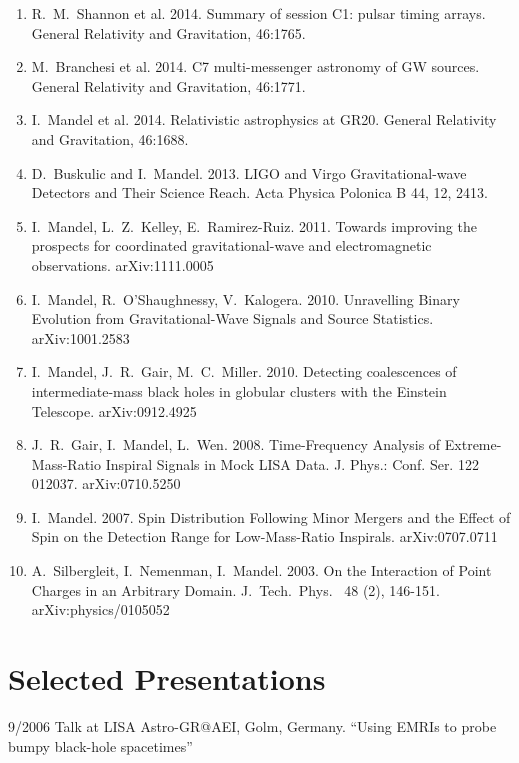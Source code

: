 \documentclass[margin,line]{res}
\begin{document}
\begin{resume}
\begin{enumerate}
\item R.~M.~Shannon et al. 2014. Summary of session C1: pulsar timing arrays. General Relativity and Gravitation, 46:1765.

\item M.~Branchesi et al. 2014.  C7 multi-messenger astronomy of GW sources.
General Relativity and Gravitation, 46:1771.

\item I.~Mandel et al.  2014.  Relativistic astrophysics at GR20.  General Relativity and Gravitation, 46:1688.

\item D.~Buskulic and I.~Mandel.  2013.  LIGO and Virgo Gravitational-wave Detectors and Their Science Reach.  Acta Physica Polonica B 44, 12, 2413.

\item I.~Mandel, L.~Z.~Kelley, E.~Ramirez-Ruiz. 2011. Towards improving the prospects for coordinated gravitational-wave and electromagnetic observations. arXiv:1111.0005
 
\item I.~Mandel, R.~O'Shaughnessy, V.~Kalogera.  2010.  Unravelling Binary Evolution from Gravitational-Wave Signals and Source Statistics. arXiv:1001.2583 

\item I.~Mandel, J.~R.~Gair, M.~C.~Miller.  2010.  Detecting coalescences of intermediate-mass black holes in globular clusters with the Einstein Telescope.  arXiv:0912.4925  

\item J.~R.~Gair, I.~Mandel, L.~Wen. 2008.  Time-Frequency Analysis of 
Extreme-Mass-Ratio Inspiral Signals in Mock LISA Data.  
J. Phys.: Conf. Ser. 122 012037.  arXiv:0710.5250

\item I.~Mandel. 2007. Spin Distribution Following Minor Mergers and the 
Effect of Spin on the Detection Range for Low-Mass-Ratio Inspirals. 
arXiv:0707.0711

\item A.~Silbergleit, I.~Nemenman, I.~Mandel. 2003. On the Interaction of 
Point Charges in an Arbitrary Domain.  J.~Tech.~Phys.~ 48 (2), 146-151.  
arXiv:physics/0105052

\end{enumerate}

\newpage
\section{\sc Selected Presentations}
9/2006 	 Talk  at LISA Astro-GR@AEI, Golm, Germany. 	 ``Using EMRIs to probe bumpy black-hole spacetimes''


\end{resume}
\end{document}
